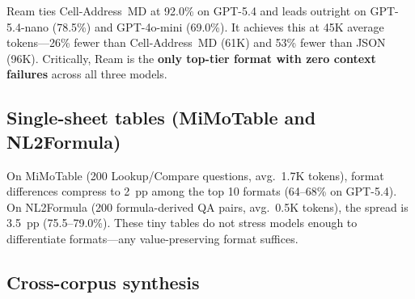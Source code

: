 \documentclass[11pt]{article}
\begin{document}
Ream ties Cell-Address~MD at 92.0\% on GPT-5.4 and leads outright on GPT-5.4-nano (78.5\%) and GPT-4o-mini (69.0\%).
It achieves this at 45K average tokens---26\% fewer than Cell-Address~MD (61K) and 53\% fewer than JSON (96K).
Critically, Ream is the \textbf{only top-tier format with zero context failures} across all three models.

\subsection{Single-sheet tables (MiMoTable and NL2Formula)}

On MiMoTable (200 Lookup/Compare questions, avg.\ 1.7K tokens), format differences compress to 2~pp among the top 10 formats (64--68\% on GPT-5.4). On NL2Formula (200 formula-derived QA pairs, avg.\ 0.5K tokens), the spread is 3.5~pp (75.5--79.0\%). These tiny tables do not stress models enough to differentiate formats---any value-preserving format suffices.

\subsection{Cross-corpus synthesis}
\end{document}

